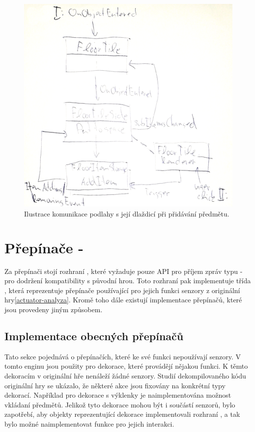 \begin{figure}[H]\centering
\includegraphics[width=\textwidth]{./img/floor-side.png}
\caption{Ilustrace komunikace podlahy s její dlaždicí při přidávání předmětu. }
\label{floor-side}
\end{figure}


\section{Přepínače - }\label{actuators-implementation}

Za přepínači stojí rozhraní , které vyžaduje pouze API pro příjem zpráv typu  - pro dodržení
kompatibility s původní hrou. Toto rozhraní pak implementuje třída , která reprezentuje přepínače používající 
pro jejich funkci senzory z originální hry\vref{actuator-analyza}. Kromě toho dále existují implementace přepínačů, které jsou provedeny
jiným způsobem.

\subsection{Implementace obecných přepínačů}
Tato sekce pojednává o přepínačích, které ke své funkci nepoužívají senzory. V tomto enginu jsou použity pro 
dekorace, které provádějí nějakou funkci. K těmto dekoracím v originální hře nenáleží žádné senzory. 
Studií dekompilovaného kódu originální hry\cite{DMDecompilation} se ukázalo, že některé akce jsou fixovány 
na konkrétní typy dekorací. Například pro dekorace s výklenky je naimplementována možnost vkládaní předmětů.
Jelikož tyto dekorace mohou být i součástí senzorů, bylo zapotřebí, aby objekty reprezentující dekorace
implementovali rozhraní , a tak bylo možné naimplementovat funkce pro jejich interakci.

